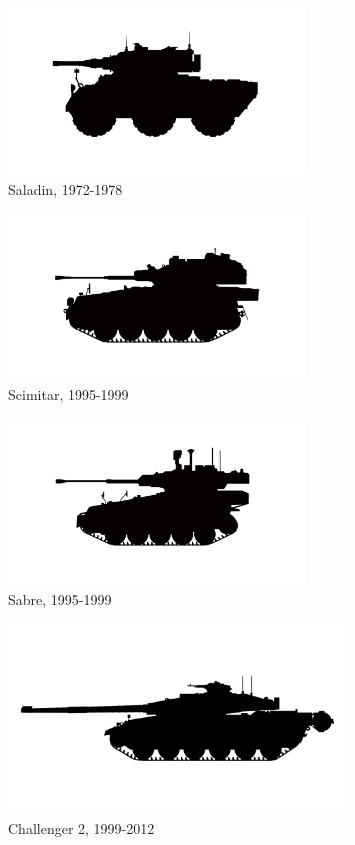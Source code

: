\begin{figure}[h]
  \centering
  \includegraphics[width=0.7\textwidth]{platforms/saladin.pdf}
  \caption*{Saladin, 1972-1978}
\end{figure}

\begin{figure}[h]
  \centering
  \includegraphics[width=0.7\textwidth]{platforms/scimitar.pdf}
  \caption*{Scimitar, 1995-1999}
\end{figure}

\begin{figure}[h]
  \centering
  \includegraphics[width=0.7\textwidth]{platforms/sabre.pdf}
  \caption*{Sabre, 1995-1999}
\end{figure}

\begin{figure}[h]
  \centering
  \includegraphics[width=0.8\textwidth]{platforms/challenger.pdf}
  \caption*{Challenger 2, 1999-2012}
\end{figure}

